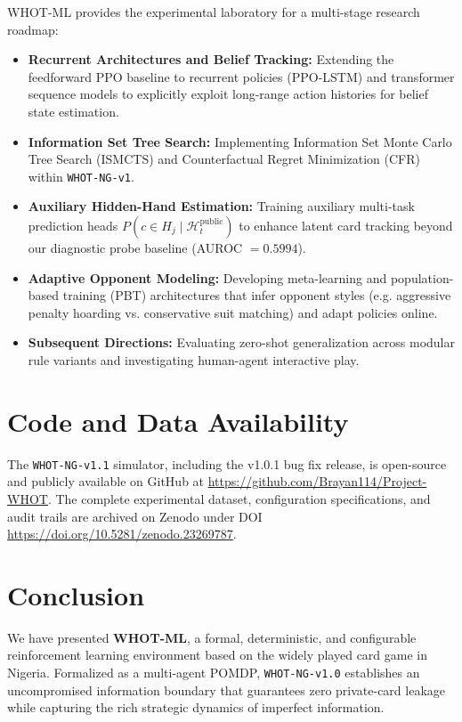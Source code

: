 \documentclass[11pt]{article}
\begin{document}
WHOT-ML provides the experimental laboratory for a multi-stage research roadmap:
\begin{itemize}
  \item \textbf{Recurrent Architectures and Belief Tracking:} Extending the feedforward PPO baseline to recurrent policies (PPO-LSTM) and transformer sequence models to explicitly exploit long-range action histories for belief state estimation.
  \item \textbf{Information Set Tree Search:} Implementing Information Set Monte Carlo Tree Search (ISMCTS) and Counterfactual Regret Minimization (CFR) within \texttt{WHOT-NG-v1}.
  \item \textbf{Auxiliary Hidden-Hand Estimation:} Training auxiliary multi-task prediction heads $P(c \in H_j \mid \mathcal{H}_t^{\text{public}})$ to enhance latent card tracking beyond our diagnostic probe baseline (AUROC $= 0.5994$).
  \item \textbf{Adaptive Opponent Modeling:} Developing meta-learning and population-based training (PBT) architectures that infer opponent styles (e.g. aggressive penalty hoarding vs. conservative suit matching) and adapt policies online.
  \item \textbf{Subsequent Directions:} Evaluating zero-shot generalization across modular rule variants and investigating human-agent interactive play.
\end{itemize}


\section*{Code and Data Availability}
The \texttt{WHOT-NG-v1.1} simulator, including the v1.0.1 bug fix release, is open-source and publicly available on GitHub at \url{https://github.com/Brayan114/Project-WHOT}. The complete experimental dataset, configuration specifications, and audit trails are archived on Zenodo under DOI \url{https://doi.org/10.5281/zenodo.23269787}.

\section{Conclusion}

We have presented \textbf{WHOT-ML}, a formal, deterministic, and configurable reinforcement learning environment based on the widely played card game in Nigeria. Formalized as a multi-agent POMDP, \texttt{WHOT-NG-v1.0} establishes an uncompromised information boundary that guarantees zero private-card leakage while capturing the rich strategic dynamics of imperfect information.
\end{document}
